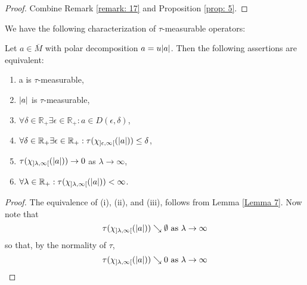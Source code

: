 \begin{proof}
    Combine Remark \ref{remark: 17} and Proposition \ref{prop: 5}.
\end{proof}
We have the following characterization of $\tau$-measurable operators: 
\begin{proposition}
    Let $a\in \overline{M}$ with polar decomposition $a=u\abs{a}$. Then the following assertions are equivalent:
    \begin{enumerate}
        \item a is $\tau$-measurable, 
        \item $\abs{a}$ is $\tau$-measurable, 
        \item $\forall \delta\in \mathbb{R}_+ \exists \epsilon\in \mathbb{R}_+: a\in D(\epsilon,\delta)$,
        \item $\forall \delta\in \mathbb{R}_+ \exists \epsilon\in \mathbb{R}_+: \tau(\chi_{]\epsilon,\infty[}(\abs{a}))\leq \delta$,
        \item $\tau(\chi_{]\lambda,\infty[}(\abs{a}))\to 0$ as $\lambda\to \infty$,
        \item $\forall \lambda\in \mathbb{R}_+:\tau(\chi_{]\lambda,\infty[}(\abs{a}))<\infty$.
    \end{enumerate}
\end{proposition}
\begin{proof}
    The equivalence of (i), (ii), and (iii), follows from Lemma \ref{Lemma 7}. Now note that 
\[
    \tau(\chi_{]\lambda,\infty[}(\abs{a}))\searrow \emptyset \text{ as }\lambda\to \infty
\]
so that, by the normality of $\tau$, 
\[
    \tau(\chi_{]\lambda,\infty[}(\abs{a}))\searrow 0 \text{ as }\lambda\to \infty
\]
\end{proof}
% 